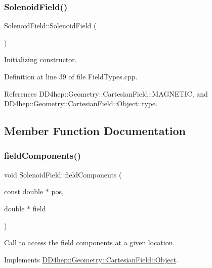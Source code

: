 \subsubsection{\texorpdfstring{Solenoid\+Field()}{SolenoidField()}}
{\footnotesize\ttfamily Solenoid\+Field\+::\+Solenoid\+Field (\begin{DoxyParamCaption}{ }\end{DoxyParamCaption})}



Initializing constructor. 



Definition at line 39 of file Field\+Types.\+cpp.



References D\+D4hep\+::\+Geometry\+::\+Cartesian\+Field\+::\+M\+A\+G\+N\+E\+T\+IC, and D\+D4hep\+::\+Geometry\+::\+Cartesian\+Field\+::\+Object\+::type.



\subsection{Member Function Documentation}
\hypertarget{class_d_d4hep_1_1_geometry_1_1_solenoid_field_aef35ec6873e2227025d3b770bdbdc1e1}{}\label{class_d_d4hep_1_1_geometry_1_1_solenoid_field_aef35ec6873e2227025d3b770bdbdc1e1} 
\subsubsection{\texorpdfstring{field\+Components()}{fieldComponents()}}
{\footnotesize\ttfamily void Solenoid\+Field\+::field\+Components (\begin{DoxyParamCaption}\item[{const double $\ast$}]{pos,  }\item[{double $\ast$}]{field }\end{DoxyParamCaption})\hspace{0.3cm}{\ttfamily [virtual]}}



Call to access the field components at a given location. 



Implements \hyperlink{class_d_d4hep_1_1_geometry_1_1_cartesian_field_1_1_object_ab3fa7f39545c8b0f769ee1ddfd03ed90}{D\+D4hep\+::\+Geometry\+::\+Cartesian\+Field\+::\+Object}.



